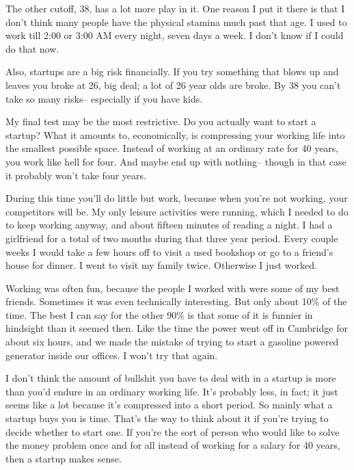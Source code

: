 The other cutoff, 38, has a lot
                    more play in it. One reason I put it there is that I don't
                    think many people have the physical stamina much past that
                    age. I used to work till 2:00 or 3:00 AM every night, seven
                    days a week. I don't know if I could do that now.

Also,
                    startups are a big risk financially. If you try something
                    that blows up and leaves you broke at 26, big deal; a lot of
                    26 year olds are broke. By 38 you can't take so many risks--
                    especially if you have kids.

My final test may be
                    the most restrictive. Do you actually want to start a
                    startup? What it amounts to, economically, is compressing
                    your working life into the smallest possible space. Instead
                    of working at an ordinary rate for 40 years, you work like
                    hell for four. And maybe end up with nothing-- though in
                    that case it probably won't take four years.

During
                    this time you'll do little but work, because when you're not
                    working, your competitors will be. My only leisure
                    activities were running, which I needed to do to keep
                    working anyway, and about fifteen minutes of reading a
                    night. I had a girlfriend for a total of two months during
                    that three year period. Every couple weeks I would take a
                    few hours off to visit a used bookshop or go to a friend's
                    house for dinner. I went to visit my family twice. Otherwise
                    I just worked.

Working was often fun, because the
                    people I worked with were some of my best friends. Sometimes
                    it was even technically interesting. But only about 10\% of
                    the time. The best I can say for the other 90\% is that some
                    of it is funnier in hindsight than it seemed then. Like the
                    time the power went off in Cambridge for about six hours,
                    and we made the mistake of trying to start a gasoline
                    powered generator inside our offices. I won't try that
                    again.

I don't think the amount of bullshit you
                    have to deal with in a startup is more than you'd endure in
                    an ordinary working life. It's probably less, in fact; it
                    just seems like a lot because it's compressed into a short
                    period. So mainly what a startup buys you is time. That's
                    the way to think about it if you're trying to decide whether
                    to start one. If you're the sort of person who would like to
                    solve the money problem once and for all instead of working
                    for a salary for 40 years, then a startup makes sense.

